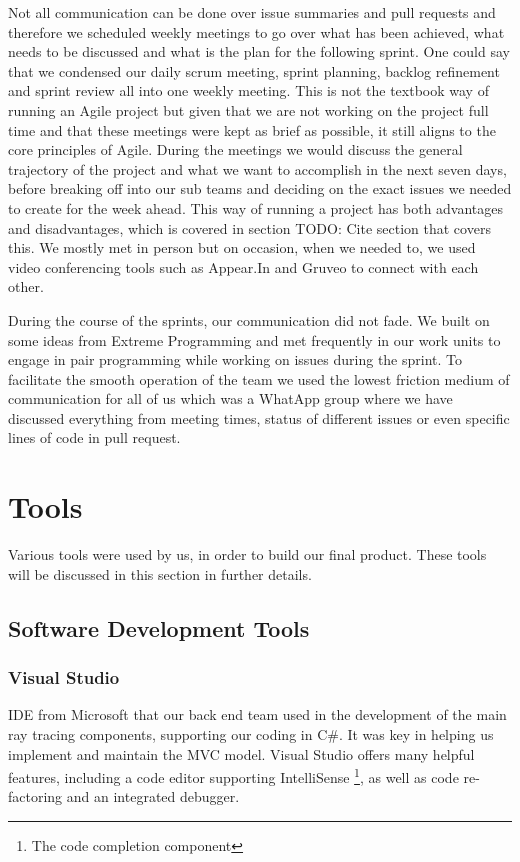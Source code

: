 \documentclass[a4paper]{report}
\begin{document}
	\par Not all communication can be done over issue summaries and pull requests and therefore we scheduled weekly meetings to go over what has been achieved, what needs to be discussed and what is the plan for the following sprint. One could say that we condensed our daily scrum meeting, sprint planning, backlog refinement and sprint review all into one weekly meeting. This is not the textbook way of running an Agile project but given that we are not working on the project full time and that these meetings were kept as brief as possible, it still aligns to the core principles of Agile. During the meetings we would discuss the general trajectory of the project and what we want to accomplish in the next seven days, before breaking off into our sub teams and deciding on the exact issues we needed to create for the week ahead. This way of running a project has both advantages and disadvantages, which is covered in section
	TODO: Cite section that covers this. We mostly met in person but on occasion, when we needed to, we used video conferencing tools such as Appear.In and Gruveo to connect with each other.\newline
	
	During the course of the sprints, our communication did not fade. We built on some ideas from Extreme Programming and met frequently in our work units to engage in pair programming while working on issues during the sprint. To facilitate the smooth operation of the team we used the lowest friction medium of communication for all of us which was a WhatApp group where we have discussed everything from meeting times, status of different issues or even specific lines of code in pull request. 
	\section{Tools} \label{sec:tools}
	Various tools were used by us, in order to build our final product. These tools will be discussed in this section in further details.
	\subsection{Software Development Tools}
	\subsubsection{Visual Studio}
	IDE from Microsoft that our back end team used in the development of the main ray tracing components, supporting our coding in C\#. It was key in helping us implement and maintain the MVC model. Visual Studio offers many helpful features, including a code editor supporting IntelliSense \footnote{The code completion component}, as well as code re-factoring and an integrated debugger.
\end{document}
